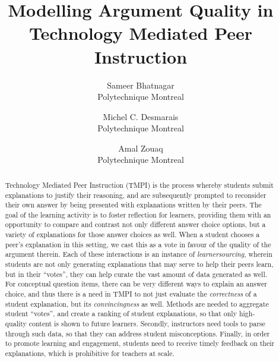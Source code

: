 \documentclass[notitlepage,12pt]{jedm}
\begin{document}
	
	\title{Modelling Argument Quality in Technology Mediated Peer Instruction}
	\date{} %
	
	\author{
		{\large Sameer Bhatnagar}
		\\Polytechnique Montreal
	 	\and 
	 	{\large Michel C. Desmarais}
	 	\\Polytechnique Montreal
	 	\and 
	 	{\large Amal Zouaq}
 		\\Polytechnique Montreal
 }

	
	\maketitle
	
	\begin{abstract}
		Technology Mediated Peer Instruction (TMPI) is the process whereby 
		students submit explanations to justify their reasoning, and are 
		subsequently prompted to reconsider their own answer by being presented 
		with explanations written by their peers. 
		The goal of the learning activity is to foster reflection for learners, 
		providing them with an opportunity to compare and contrast not only 
		different answer choice options, but a variety of explanations for 
		those answer choices as well.
		When a student chooses a peer's explanation in this setting, we cast 
		this as a vote in favour of the quality of the argument therein.
		Each of these interactions is an instance of \textit{learnersourcing}, 
		wherein students are not only generating explanations that may serve to 
		help their peers learn, but in their ``votes'', they can help curate 
		the vast amount of data generated as well.
		For conceptual question items, there can be very different ways to 
		explain an answer choice, and thus there is a need in TMPI to not just 
		evaluate the \textit{correctness} of a student explanation, but its 
		\textit{convincingness} as well.
		Methods are needed to aggregate student ``votes'', and create a ranking 
		of student explanations, so that only high-quality content is shown to 
		future learners.
		Secondly, instructors need tools to parse through such data, so that 
		they can address student misconceptions.
		Finally, in order to promote learning and engagement, students need to 
		receive timely feedback on their explanations, which is prohibitive for 
		teachers at scale.  


\end{abstract}
\end{document}
